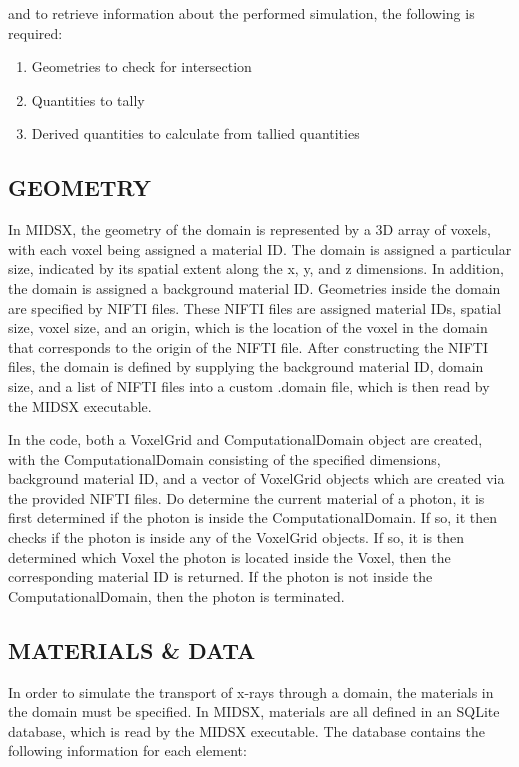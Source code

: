 \documentclass[%
 aip,
cp,  %
 amsmath,amssymb,%
reprint,%
]{revtex4-2}
\begin{document}
and to retrieve information about the performed simulation, the following is required:

\begin{enumerate}
    \item Geometries to check for intersection
    \item Quantities to tally
    \item Derived quantities to calculate from tallied quantities
\end{enumerate}

\subsection{GEOMETRY}
\par In MIDSX, the geometry of the domain is represented by a 3D array of voxels, with each voxel being assigned a material ID. The domain is assigned a particular size, indicated by its spatial extent along the x, y, and z dimensions. In addition, the domain is assigned a background material ID. Geometries inside the domain are specified by NIFTI files. These NIFTI files are assigned material IDs, spatial size, voxel size, and an origin, which is the location of the voxel in the domain that corresponds to the origin of the NIFTI file. After constructing the NIFTI files, the domain is defined by supplying the background material ID, domain size, and a list of NIFTI files into a custom .domain file, which is then read by the MIDSX executable. \\
\par In the code, both a VoxelGrid and ComputationalDomain object are created, with the ComputationalDomain consisting of the specified dimensions, background material ID, and a vector of VoxelGrid objects which are created via the provided NIFTI files. Do determine the current material of a photon, it is first determined if the photon is inside the ComputationalDomain. If so, it then checks if the photon is inside any of the VoxelGrid objects. If so, it is then determined which Voxel the photon is located inside the Voxel, then the corresponding material ID is returned. If the photon is not inside the ComputationalDomain, then the photon is terminated. \\

\subsection{MATERIALS \& DATA}
\par In order to simulate the transport of x-rays through a domain, the materials in the domain must be specified. In MIDSX, materials are all defined in an SQLite database, which is read by the MIDSX executable. The database contains the following information for each element:
\end{document}
